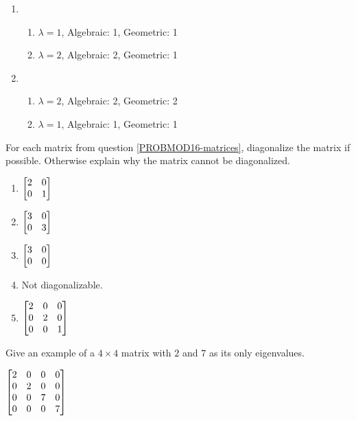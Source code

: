 \begin{exercises}
\begin{problist}
\begin{solution}
\begin{enumerate}
				\item
					\begin{enumerate}
						\item $\lambda=1$, Algebraic: 1,
							Geometric: 1

						\item $\lambda=2$, Algebraic: 2,
							Geometric: 1
					\end{enumerate}%


				\item
					\begin{enumerate}
						\item $\lambda=2$, Algebraic: 2,
							Geometric: 2

						\item $\lambda=1$, Algebraic: 1,
							Geometric: 1
					\end{enumerate}
			\end{enumerate}
		\end{solution}

		\prob For each matrix from question \ref{PROBMOD16-matrices},
		diagonalize the matrix if possible. Otherwise explain why the matrix cannot
		be diagonalized. %

		\begin{solution}

			\begin{enumerate}
				\item $\mat{2&0\\0&1}$

				\item $\mat{3&0\\0&3}$

				\item $\mat{3&0\\0&0}$

				\item Not diagonalizable.

				\item $\mat{2&0&0\\0&2&0\\0&0&1}$
			\end{enumerate}
		\end{solution}

		\prob Give an example of a $4\times 4$ matrix with $2$ and $7$
		as its only eigenvalues.
		\begin{solution}

				$\mat{2&0&0&0\\0&2&0&0\\0&0&7&0\\0&0&0&7}$
		\end{solution}


\end{problist}
\end{exercises}
